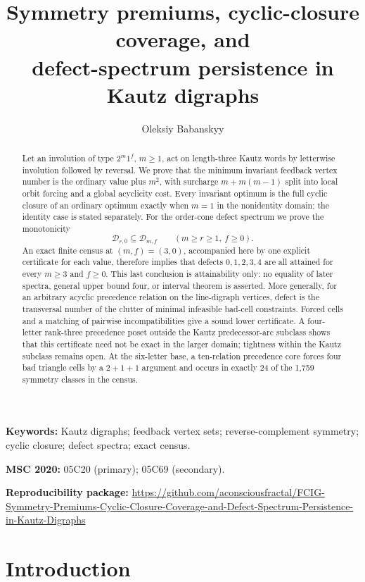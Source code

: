 \documentclass[11pt,a4paper]{article}
\title{Symmetry premiums, cyclic-closure coverage, and\\
defect-spectrum persistence in Kautz digraphs}
\author{Oleksiy Babanskyy}
\date{}
\theoremstyle{remark}
\newcommand{\Dspec}{\mathcal D}
\begin{document}
\pagestyle{plain}

\maketitle

\begin{abstract}
Let an involution of type \(2^m1^f\), \(m\geq1\), act on length-three
Kautz words by letterwise involution followed by reversal.  We prove that the
minimum invariant feedback vertex number is the ordinary value plus \(m^2\),
with surcharge \(m+m(m-1)\) split into local orbit forcing and a global
acyclicity cost.  Every invariant optimum is the full cyclic closure of an
ordinary optimum exactly when \(m=1\) in the nonidentity domain; the identity
case is stated separately.  For the order-cone defect spectrum we prove the
monotonicity
\[
  \Dspec_{r,0}\subseteq\Dspec_{m,f}
  \qquad(m\geq r\geq1,\ f\geq0).
\]
An exact finite census at \((m,f)=(3,0)\), accompanied here by one explicit
certificate for each value, therefore implies that defects \(0,1,2,3,4\)
are all attained for every \(m\geq3\) and \(f\geq0\).  This last conclusion
is attainability only: no equality of later spectra, general upper bound four,
or interval theorem is asserted.  More generally, for an arbitrary acyclic
precedence relation on the line-digraph vertices, defect is the transversal
number of the clutter of minimal infeasible bad-cell constraints.  Forced
cells and a matching of pairwise incompatibilities give a sound lower
certificate.  A four-letter rank-three precedence poset outside the Kautz
predecessor-arc subclass shows that this certificate need not be exact in the
larger domain; tightness within the Kautz subclass remains open.  At the
six-letter base, a ten-relation precedence core forces four bad triangle cells
by a \(2+1+1\) argument and occurs in exactly 24 of the 1,759 symmetry classes
in the census.
\end{abstract}

\noindent\textbf{Keywords:} Kautz digraphs; feedback vertex sets;
reverse-complement symmetry; cyclic closure; defect spectra; exact census.

\medskip
\noindent\textbf{MSC 2020:} 05C20 (primary); 05C69 (secondary).

\medskip
\noindent\textbf{Reproducibility package:}
\url{https://github.com/aconsciousfractal/FCIG-Symmetry-Premiums-Cyclic-Closure-Coverage-and-Defect-Spectrum-Persistence-in-Kautz-Digraphs}

\section{Introduction}
\label{sec:introduction}
\end{document}
